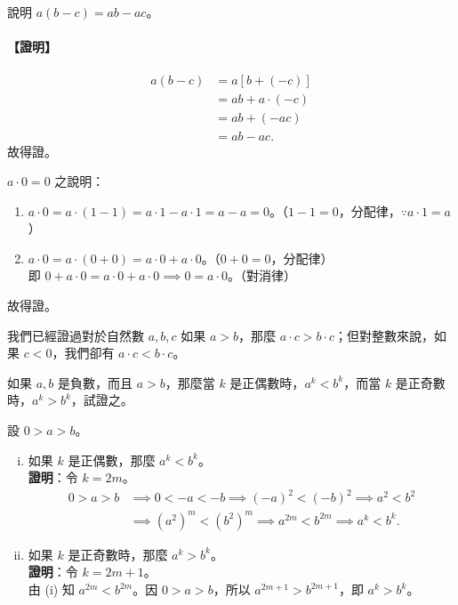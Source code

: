 \setcounter{example}{0}
\begin{example}\label{ex:b1-3-6}
說明 $a(b-c) = ab - ac$。
\end{example}

\paragraph{【證明】}
\begin{align*}
  a(b-c) &= a[b+(-c)] \\
  &= ab + a \cdot (-c) \\
  &= ab + (-ac) \\
  &= ab - ac.
\end{align*}
故得證。

\medskip
\begin{example}\label{ex:b1-3-7}
$a \cdot 0 = 0$ 之說明：
\begin{enumerate}[1.]
  \item $a \cdot 0 = a \cdot (1-1) = a \cdot 1 - a \cdot 1 = a - a = 0$。（$1-1=0$，分配律，$\because a \cdot 1 = a$）
  \item $a \cdot 0 = a \cdot (0+0) = a \cdot 0 + a \cdot 0$。（$0+0=0$，分配律）\\
  即 $0 + a \cdot 0 = a \cdot 0 + a \cdot 0 \implies 0 = a \cdot 0$。（對消律）
\end{enumerate}
故得證。
\end{example}

\medskip
我們已經證過對於自然數 $a, b, c$ 如果 $a > b$，那麼 $a \cdot c > b \cdot c$；但對整數來說，如果 $c < 0$，我們卻有 $a \cdot c < b \cdot c$。

\medskip
\begin{example}\label{ex:b1-3-8}
如果 $a, b$ 是負數，而且 $a > b$，那麼當 $k$ 是正偶數時，$a^k < b^k$，而當 $k$ 是正奇數時，$a^k > b^k$，試證之。
\end{example}

設 $0 > a > b$。
\begin{enumerate}[(i)]
  \item 如果 $k$ 是正偶數，那麼 $a^k < b^k$。\\
  \textbf{證明}：令 $k = 2m$。
  \begin{align*}
    0 > a > b &\implies 0 < -a < -b \implies (-a)^2 < (-b)^2 \implies a^2 < b^2 \\
    &\implies (a^2)^m < (b^2)^m \implies a^{2m} < b^{2m} \implies a^k < b^k.
  \end{align*}
  \item 如果 $k$ 是正奇數時，那麼 $a^k > b^k$。\\
  \textbf{證明}：令 $k = 2m+1$。\\
  由 (i) 知 $a^{2m} < b^{2m}$。因 $0 > a > b$，所以 $a^{2m+1} > b^{2m+1}$，即 $a^k > b^k$。
\end{enumerate}

